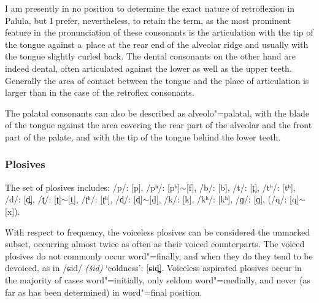 


I am presently in no position to determine the exact nature of retroflexion in Palula, but I prefer, nevertheless, to retain the term, as the most prominent feature in the pronunciation of these consonants is the articulation with the tip of the tongue against a~place at the rear end of the alveolar ridge and usually with the tongue slightly curled back. The dental consonants on the other hand are indeed dental, often articulated against the lower as well as the upper teeth. Generally the area of contact between the tongue and the place of articulation is larger than in the case of the retroflex consonants.


The palatal consonants can also be described as alveolo"=palatal, with the blade of the tongue against the area covering the rear part of the alveolar and the front part of the palate, and with the tip of the tongue behind the lower teeth. 

\subsubsection*{Plosives}
The set of plosives includes: /p/: [p], /pʰ/: [pʰ]$\sim$[f], /b/: [b], /t/: [t̪], /tʰ/: [tʰ], /d/: [d̪], /ʈ/: [ʈ]$\sim$[ṯ], /ʈʰ/: [ʈʰ], /ɖ/: [ɖ]$\sim$[ḏ], /k/: [k], /kʰ/: [kʰ], /ɡ/: [ɡ], (/q/: [q]$\sim$[x]).

With respect to frequency, the voiceless plosives can be considered the unmarked subset, occurring almost twice as often as their voiced counterparts. The voiced plosives do not commonly occur word"=finally, and when they do they tend to be devoiced, as in /ɕid/ \textit{(šid)} `coldness': [ɕid̪̥]. Voiceless aspirated plosives occur in the majority of cases word"=initially, only seldom word"=medially, and never (as far as has been determined) in word"=final position. 


